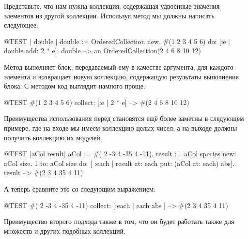 \documentclass[a4paper,10pt,twoside]{book}
\begin{document}
Представьте, что нам нужна коллекция, содержащая удвоенные значения элементов из другой коллекции. Используя метод  мы должны написать следующее:

\begin{code}{@TEST | double |}
double := OrderedCollection new.
#(1 2 3 4 5 6) do: [:e | double add: 2 * e].
double --> an OrderedCollection(2 4 6 8 10 12)
\end{code}

\noindent
Метод  выполняет блок, передаваемый ему в качестве аргумента, для каждого элемента и возвращает новую коллекцию, содержащую результаты выполнения блока.
С методом  код выглядит намного проще:
\begin{code}{@TEST}
#(1 2 3 4 5 6) collect: [:e | 2 * e] --> #(2 4 6 8 10 12)
\end{code}

Преимущества использования  перед  становятся ещё более заметны в следующем примере, где на входе мы имеем коллекцию целых чисел, а на выходе должны получить коллекцию их модулей.

\begin{code}{@TEST |aCol result|}
aCol :=  #( 2 -3 4 -35 4 -11).
result := aCol species new: aCol size.
1 to: aCol size do: [ :each | result at: each put: (aCol at: each) abs].
result --> #(2 3 4 35 4 11)
\end{code}
\noindent
А теперь сравните это со следующим выражением:
\begin{code}{@TEST}
#( 2 -3 4 -35 4 -11) collect: [:each | each abs ] --> #(2 3 4 35 4 11)
\end{code}
\noindent
Преимущество второго подхода также в том, что он будет работать также для множеств и других подобных коллекций.
\end{document}
